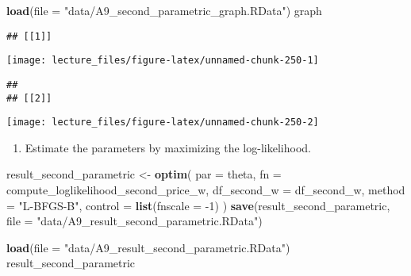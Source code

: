 \documentclass[
]{book}
\newenvironment{Shaded}{\begin{snugshade}}{\end{snugshade}}
\newcommand{\DataTypeTok}[1]{\textcolor[rgb]{0.13,0.29,0.53}{#1}}
\newcommand{\DecValTok}[1]{\textcolor[rgb]{0.00,0.00,0.81}{#1}}
\newcommand{\KeywordTok}[1]{\textcolor[rgb]{0.13,0.29,0.53}{\textbf{#1}}}
\newcommand{\NormalTok}[1]{#1}
\newcommand{\StringTok}[1]{\textcolor[rgb]{0.31,0.60,0.02}{#1}}
\providecommand{\tightlist}{%
  \setlength{\itemsep}{0pt}\setlength{\parskip}{0pt}}
\begin{document}
\begin{Shaded}
\begin{Highlighting}[]
\KeywordTok{load}\NormalTok{(}\DataTypeTok{file =} \StringTok{"data/A9_second_parametric_graph.RData"}\NormalTok{)}
\NormalTok{graph}
\end{Highlighting}
\end{Shaded}

\begin{verbatim}
## [[1]]
\end{verbatim}

\begin{center}\texttt{[image: lecture\_files/figure-latex/unnamed-chunk-250-1]} \end{center}

\begin{verbatim}
## 
## [[2]]
\end{verbatim}

\begin{center}\texttt{[image: lecture\_files/figure-latex/unnamed-chunk-250-2]} \end{center}

\begin{enumerate}
\def\labelenumi{\arabic{enumi}.}
\setcounter{enumi}{3}
\tightlist
\item
  Estimate the parameters by maximizing the log-likelihood.
\end{enumerate}

\begin{Shaded}
\begin{Highlighting}[]
\NormalTok{result_second_parametric <-}
\StringTok{  }\KeywordTok{optim}\NormalTok{(}
    \DataTypeTok{par =}\NormalTok{ theta,}
    \DataTypeTok{fn =}\NormalTok{ compute_loglikelihood_second_price_w,}
    \DataTypeTok{df_second_w =}\NormalTok{ df_second_w,}
    \DataTypeTok{method =} \StringTok{"L-BFGS-B"}\NormalTok{,}
    \DataTypeTok{control =} \KeywordTok{list}\NormalTok{(}\DataTypeTok{fnscale =} \DecValTok{-1}\NormalTok{)}
\NormalTok{  )}
\KeywordTok{save}\NormalTok{(result_second_parametric, }\DataTypeTok{file =} \StringTok{"data/A9_result_second_parametric.RData"}\NormalTok{)}
\end{Highlighting}
\end{Shaded}

\begin{Shaded}
\begin{Highlighting}[]
\KeywordTok{load}\NormalTok{(}\DataTypeTok{file =} \StringTok{"data/A9_result_second_parametric.RData"}\NormalTok{)}
\NormalTok{result_second_parametric}
\end{Highlighting}
\end{Shaded}
\end{document}
